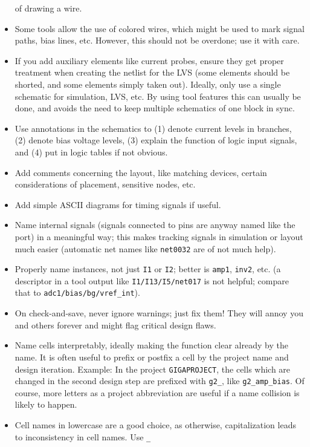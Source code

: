 \documentclass[
  a4paper,
  DIV=11,
  numbers=noendperiod]{scrartcl}
\begin{document}
\begin{itemize}
  of drawing a wire.
\item
  Some tools allow the use of colored wires, which might be used to mark
  signal paths, bias lines, etc. However, this should not be overdone;
  use it with care.
\item
  If you add auxiliary elements like current probes, ensure they get
  proper treatment when creating the netlist for the LVS (some elements
  should be shorted, and some elements simply taken out). Ideally, only
  use a single schematic for simulation, LVS, etc. By using tool
  features this can usually be done, and avoids the need to keep
  multiple schematics of one block in sync.
\item
  Use annotations in the schematics to (1) denote current levels in
  branches, (2) denote bias voltage levels, (3) explain the function of
  logic input signals, and (4) put in logic tables if not obvious.
\item
  Add comments concerning the layout, like matching devices, certain
  considerations of placement, sensitive nodes, etc.
\item
  Add simple ASCII diagrams for timing signals if useful.
\item
  Name internal signals (signals connected to pins are anyway named like
  the port) in a meaningful way; this makes tracking signals in
  simulation or layout much easier (automatic net names like
  \texttt{net0032} are of not much help).
\item
  Properly name instances, not just \texttt{I1} or \texttt{I2}; better
  is \texttt{amp1}, \texttt{inv2}, etc. (a descriptor in a tool output
  like \texttt{I1/I13/I5/net017} is not helpful; compare that to
  \texttt{adc1/bias/bg/vref\_int}).
\item
  On check-and-save, never ignore warnings; just fix them! They will
  annoy you and others forever and might flag critical design flaws.
\item
  Name cells interpretably, ideally making the function clear already by
  the name. It is often useful to prefix or postfix a cell by the
  project name and design iteration. Example: In the project
  \texttt{GIGAPROJECT}, the cells which are changed in the second design
  step are prefixed with \texttt{g2\_}, like \texttt{g2\_amp\_bias}. Of
  course, more letters as a project abbreviation are useful if a name
  collision is likely to happen.
\item
  Cell names in lowercase are a good choice, as otherwise,
  capitalization leads to inconsistency in cell names. Use \texttt{\_}

\end{itemize}
\end{document}
